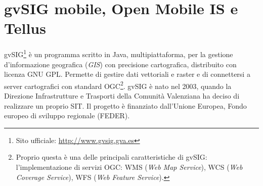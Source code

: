 \section{gvSIG mobile, Open Mobile IS e Tellus}

	gvSIG\footnote{Sito ufficiale: \href{http://www.gvsig.gva.es}{http://www.gvsig.gva.es}} è un programma scritto in Java, multipiattaforma, per la gestione d'informazione geografica (\emph{GIS}) con precisione cartografica, distribuito con licenza GNU GPL. Permette di gestire dati vettoriali e raster e di connettersi a server cartografici con standard OGC\footnote{Proprio questa è una delle principali caratteristiche di gvSIG: l'implementazione di servizi OGC: WMS (\emph{Web Map Service}), WCS (\emph{Web Coverage Service}), WFS (\emph{Web Feature Service}).}. gvSIG è nato nel 2003, quando la Direzione Infrastrutture e Trasporti della Comunità Valenziana ha deciso di realizzare un proprio SIT. Il progetto è finanziato dall'Unione Europea, Fondo europeo di sviluppo regionale (FEDER).
	
